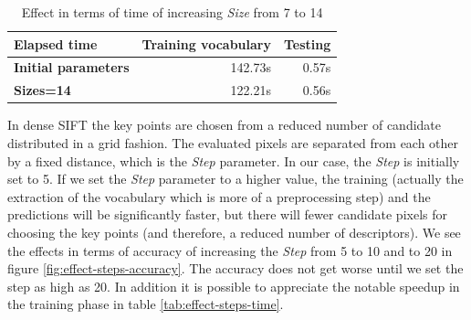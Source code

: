 \begin{table}[htb]
	\centering
	\begin{tabular}{l|rr}
		{\bfseries Elapsed time} 			 & {\bfseries Training vocabulary} & {\bfseries Testing} \\ \hline
		{\bfseries Initial parameters} & 142.73s												 & 0.57s \\
		{\bfseries Sizes=14}           & 122.21s												 & 0.56s \\
	\end{tabular}
	\caption{Effect in terms of time of increasing \emph{Size} from 7 to 14}
	\label{fig:effect-size-time}
\end{table}

In dense SIFT the key points are chosen from a reduced number of candidate distributed in a grid fashion. The evaluated pixels are separated from each other by a fixed distance, which is the \emph{Step} parameter. In our case, the \emph{Step} is initially set to 5. If we set the \emph{Step} parameter to a higher value, the training (actually the extraction of the vocabulary which is more of a preprocessing step) and the predictions will be significantly faster, but there will fewer candidate pixels for choosing the key points (and therefore, a reduced number of descriptors). We see the effects in terms of accuracy of increasing the \emph{Step} from 5 to 10 and to 20 in figure \ref{fig:effect-steps-accuracy}. The accuracy does not get worse until we set the step as high as 20. In addition it is possible to appreciate the notable speedup in the training phase in table \ref{tab:effect-steps-time}.

